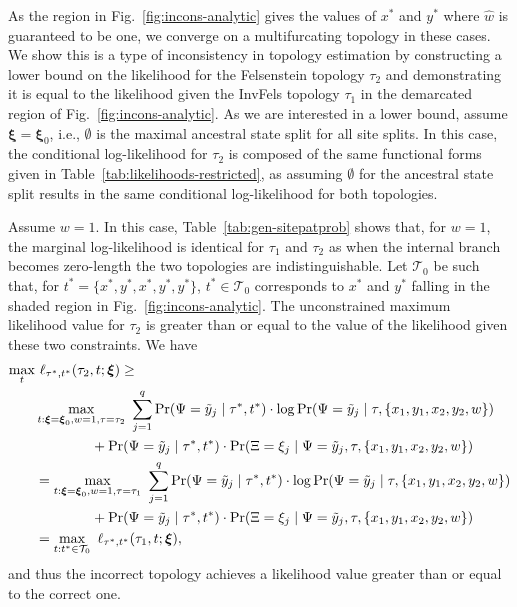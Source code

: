 As the region in Fig.~\ref{fig:incons-analytic} gives the values of $x^*$ and $y^*$ where $\hat{w}$ is guaranteed to be one, we converge on a multifurcating topology in these cases.
We show this is a type of inconsistency in topology estimation by constructing a lower bound on the likelihood for the Felsenstein topology $\tau_2$ and demonstrating it is equal to the likelihood given the InvFels topology $\tau_1$ in the demarcated region of Fig.~\ref{fig:incons-analytic}.
As we are interested in a lower bound, assume $\boldsymbol\xi=\boldsymbol\xi_0$, i.e., $\emptyset$ is the maximal ancestral state split for all site splits.
In this case, the conditional log-likelihood for $\tau_2$ is composed of the same functional forms given in Table~\ref{tab:likelihoods-restricted}, as assuming $\emptyset$ for the ancestral state split results in the same conditional log-likelihood for both topologies.

Assume $w=1$.
In this case, Table~\ref{tab:gen-sitepatprob} shows that, for $w=1$, the marginal log-likelihood is identical for $\tau_1$ and $\tau_2$ as when the internal branch becomes zero-length the two topologies are indistinguishable.
Let $\mathcal{T}_0$ be such that, for $t^*=\{x^*,y^*,x^*,y^*,y^*\}$, $t^*\in\mathcal{T}_0$ corresponds to $x^*$ and $y^*$ falling in the shaded region in Fig.~\ref{fig:incons-analytic}.
The unconstrained maximum likelihood value for $\tau_2$ is greater than or equal to the value of the likelihood given these two constraints.
We have
\begin{align*}
\max_{t} & \ \ell_{\tau^*,t^*}(\tau_2, t; \boldsymbol\xi) \ge \\
&\max_{t: \boldsymbol\xi=\boldsymbol\xi_0, w=1, \tau=\tau_2} \ \sum_{j=1}^\nSiteSplits \Pr(\siteSplitRV=\siteSplit_j \mid \tau^*, t^*) \cdot \log \Pr(\siteSplitRV=\siteSplit_j \mid \tau, \{x_1,y_1,x_2,y_2,w\}) \\
&\qquad\qquad + \Pr(\siteSplitRV=\siteSplit_j \mid \tau^*, t^*) \cdot \Pr(\ancestralSplitRV=\xi_j \mid \siteSplitRV=\siteSplit_j, \tau, \{x_1,y_1,x_2,y_2,w\}) \\
&= \max_{t: \boldsymbol\xi=\boldsymbol\xi_0, w=1, \tau=\tau_1} \ \sum_{j=1}^\nSiteSplits \Pr(\siteSplitRV=\siteSplit_j \mid \tau^*, t^*) \cdot \log \Pr(\siteSplitRV=\siteSplit_j \mid \tau, \{x_1,y_1,x_2,y_2,w\})\\
&\qquad\qquad + \Pr(\siteSplitRV=\siteSplit_j \mid \tau^*, t^*) \cdot \Pr(\ancestralSplitRV=\xi_j \mid \siteSplitRV=\siteSplit_j, \tau, \{x_1,y_1,x_2,y_2,w\})\\
&= \max_{t : t^*\in\mathcal{T}_0} \ \ell_{\tau^*,t^*}(\tau_1, t; \boldsymbol\xi),
\end{align*}
and thus the incorrect topology achieves a likelihood value greater than or equal to the correct one.

